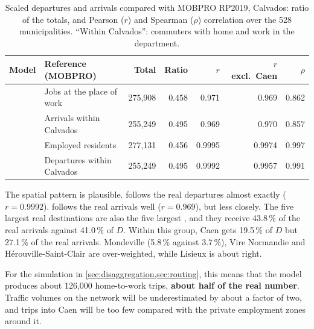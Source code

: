 \begin{table}[H]
  \centering
  \caption{Scaled departures \Oprime{} and arrivals \Dj{} compared with MOBPRO RP2019, Calvados: ratio of the totals,
  and Pearson ($r$) and Spearman ($\rho$) correlation over the 528 municipalities. ``Within Calvados'': commuters with
  home and work in the department.}
  \label{tab:attraction-plausibility}
  \begin{tabular}{@{}llrrrrr@{}}
    \toprule
    Model & Reference (MOBPRO) & Total & Ratio & $r$ & $r$ excl.\ Caen & $\rho$ \\
    \midrule
    \Dj{} & Jobs at the place of work & 275{,}908 & 0.458 & 0.971 & 0.969 & 0.862 \\
    \Dj{} & Arrivals within Calvados & 255{,}249 & 0.495 & 0.969 & 0.970 & 0.857 \\
    \Oprime{} & Employed residents & 277{,}131 & 0.456 & 0.9995 & 0.9974 & 0.997 \\
    \Oprime{} & Departures within Calvados & 255{,}249 & 0.495 & 0.9992 & 0.9957 & 0.991 \\
    \bottomrule
  \end{tabular}
\end{table}

The spatial pattern is plausible. \Oprime{} follows the real departures almost exactly ($r = 0.9992$). \Dj{} follows
the real arrivals well ($r = 0.969$), but less closely. The five largest real destinations are also the five largest
\Dj{}, and they receive 43.8\,\% of the real arrivals against 41.0\,\% of $D$. Within this group, Caen gets 19.5\,\% of
$D$ but 27.1\,\% of the real arrivals. Mondeville (5.8\,\% against 3.7\,\%), Vire Normandie and
H\'erouville-Saint-Clair are over-weighted, while Lisieux is about right.

For the simulation in \cref{sec:disaggregation,sec:routing}, this means that the model produces about 126{,}000
home-to-work trips, \textbf{about half of the real number}. Traffic volumes on the network will be underestimated by
about a factor of two, and trips into Caen will be too few compared with the private employment zones around it.

